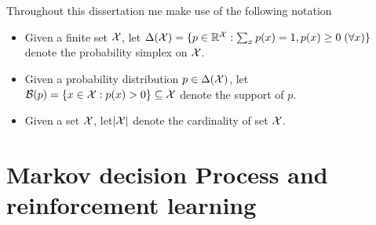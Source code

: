 Throughout this dissertation me make use of the following notation
\begin{itemize}
  \item Given a finite set $\mathcal{X}$, let $\Delta(\mathcal{X})=\{p\in\mathbb{R}^{\mathcal{X}}:\sum_x p(x)=1, p(x)\geq 0\;(\forall x)\}$ denote the probability simplex on $\mathcal{X}$. 
  \item Given a probability distribution $p\in\Delta(\mathcal{X})$, let $\mathcal{B}(p)=\{x\in\mathcal{X}:p(x) > 0\}\subseteq\mathcal{X}$ denote the support of $p$.
  \item Given a set $\mathcal{X}$, let$\lvert\mathcal{X}\rvert$ denote the cardinality of set $\mathcal{X}$.
\end{itemize}
\section{Markov decision Process and reinforcement learning}




